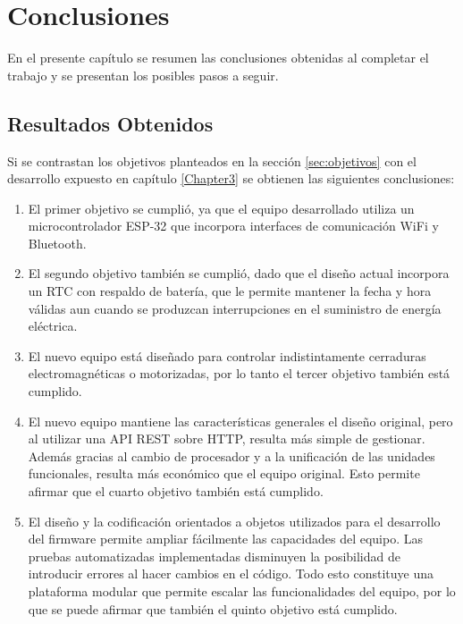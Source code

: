 \chapter{Conclusiones}
\label{Chapter5}

En el presente capítulo se resumen las conclusiones obtenidas al completar el trabajo y se presentan los posibles pasos a seguir.

\section{Resultados Obtenidos}

Si se contrastan los objetivos planteados en la sección \ref{sec:objetivos} con el desarrollo expuesto en capítulo \ref{Chapter3} se obtienen las siguientes conclusiones:

\begin{enumerate}
	\item El primer objetivo se cumplió, ya que el equipo desarrollado utiliza un microcontrolador ESP-32 que incorpora interfaces de comunicación WiFi y Bluetooth.
	
	\item El segundo objetivo también se cumplió, dado que el diseño actual incorpora un RTC con respaldo de batería, que le permite mantener la fecha y hora válidas aun cuando se produzcan interrupciones en el suministro de energía eléctrica.
	
	\item El nuevo equipo está diseñado para controlar indistintamente cerraduras electromagnéticas o motorizadas, por lo tanto el tercer objetivo también está cumplido.
	
	\item El nuevo equipo mantiene las características generales el diseño original, pero al utilizar una API REST sobre HTTP, resulta más simple de gestionar. Además gracias al cambio de procesador y a la unificación de las unidades funcionales, resulta más económico que el equipo original. Esto permite afirmar que el cuarto objetivo también está cumplido.
	
	\item El diseño y la codificación orientados a objetos utilizados para el desarrollo del firmware permite ampliar fácilmente las capacidades del equipo. Las pruebas automatizadas implementadas disminuyen la posibilidad de introducir errores al hacer cambios en el código. Todo esto constituye una plataforma modular que permite escalar las funcionalidades del equipo, por lo que se puede afirmar que también el quinto objetivo está cumplido.
\end{enumerate}

